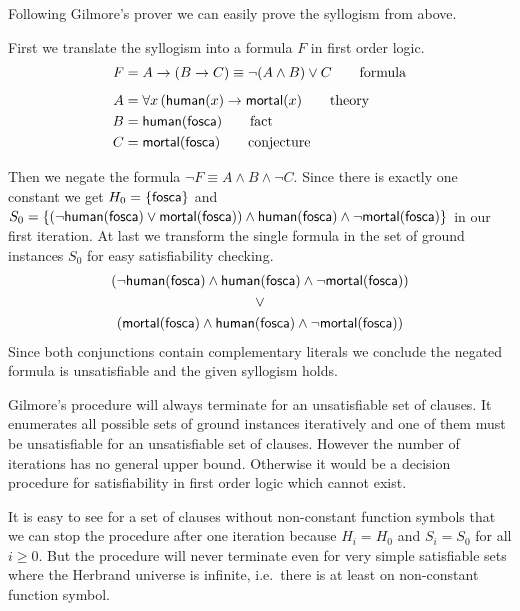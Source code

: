 Following Gilmore's prover we can easily prove the syllogism from above.

\begin{example}\label{ex:syllo}
	First we translate the syllogism into a formula $F$ in first order logic.
	\begin{align*}
		F &= A \rightarrow (B \rightarrow C) \equiv \lnot(A\land B) \lor C 
		\tag*{formula}
		\\[0.5em]
		A &= \forall x\, ( \mathsf{human}(x) \rightarrow \mathsf{mortal}(x) 
		\tag*{theory}
		\\
		B &= \mathsf{human}(\mathsf{fosca}) 
		\tag*{fact}
		\\
		C &= \mathsf{mortal}(\mathsf{fosca})
		\tag*{conjecture}
	\end{align*}
 


	Then we negate the formula $\lnot F \equiv A\land B \land\lnot C$.
	Since there is exactly one constant we get
	$H_0 = \{ \mathsf{fosca} \}$ and 
	$S_0 = 
	\{
	(\lnot\mathsf{human}(\mathsf{fosca})\lor\mathsf{mortal}(\mathsf{fosca}))\land\mathsf{human}(\mathsf{fosca})\land\lnot\mathsf{mortal}(\mathsf{fosca})
	\}$ in our first iteration. 
	At last we transform the single formula in 
	the set of ground instances $S_0$ for easy satisfiability checking.
%
\begin{gather*}
(\lnot\mathsf{human}(\mathsf{fosca})\land\mathsf{human}(\mathsf{fosca})\land\lnot\mathsf{mortal}(\mathsf{fosca}))
\\ 
\lor
\\ 
(\mathsf{mortal}(\mathsf{fosca})\land\mathsf{human}(\mathsf{fosca})\land\lnot\mathsf{mortal}(\mathsf{fosca}))
\end{gather*}
Since both conjunctions contain complementary literals we conclude the negated formula is unsatisfiable
 and the given syllogism holds.
 
\end{example}

Gilmore's procedure will always terminate for an unsatisfiable set of clauses.
It enumerates all possible sets of ground instances iteratively
and one of them must be unsatisfiable for an unsatisfiable set of clauses. 
However the number of iterations has no general upper bound. 
Otherwise it would be a decision procedure for satisfiability in first order logic
which cannot exist.

It is easy to see for a set of clauses without non-constant function symbols that we can stop the procedure after one iteration because $H_i = H_0$ and $S_i = S_0$ for all $i\geq0$.
%
But the procedure will never terminate even for very simple satisfiable sets where the Herbrand universe is infinite, i.e.~there is at least on non-constant function symbol.

